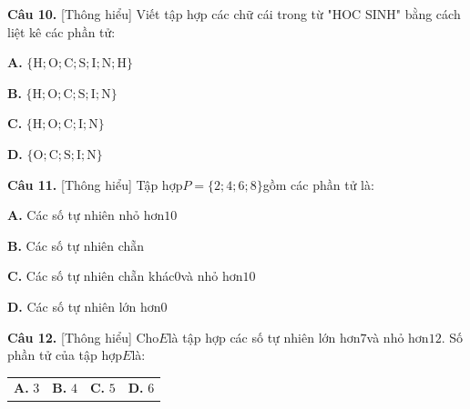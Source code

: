 \documentclass[11pt,a4paper]{article}
\begin{document}
\noindent\textbf{Câu 10.} [Thông hiểu] Viết tập hợp các chữ cái trong từ "HOC SINH" bằng cách liệt kê các phần tử:\par\vspace{2pt}
\noindent\textbf{A.} $\{\text{H}; \text{O}; \text{C}; \text{S}; \text{I}; \text{N}; \text{H}\}$\par\vspace{1pt}
\noindent\textbf{B.} $\{\text{H}; \text{O}; \text{C}; \text{S}; \text{I}; \text{N}\}$\par\vspace{1pt}
\noindent\textbf{C.} $\{\text{H}; \text{O}; \text{C}; \text{I}; \text{N}\}$\par\vspace{1pt}
\noindent\textbf{D.} $\{\text{O}; \text{C}; \text{S}; \text{I}; \text{N}\}$\par\vspace{5pt}

\noindent\textbf{Câu 11.} [Thông hiểu] Tập hợp$P = \{2; 4; 6; 8\}$gồm các phần tử là:\par\vspace{2pt}
\noindent\textbf{A.} Các số tự nhiên nhỏ hơn$10$\par\vspace{1pt}
\noindent\textbf{B.} Các số tự nhiên chẵn\par\vspace{1pt}
\noindent\textbf{C.} Các số tự nhiên chẵn khác$0$và nhỏ hơn$10$\par\vspace{1pt}
\noindent\textbf{D.} Các số tự nhiên lớn hơn$0$\par\vspace{5pt}

\noindent\textbf{Câu 12.} [Thông hiểu] Cho$E$là tập hợp các số tự nhiên lớn hơn$7$và nhỏ hơn$12$. Số phần tử của tập hợp$E$là:\par\vspace{2pt}
\noindent\begin{tabular*}{\textwidth}{@{\extracolsep{\fill}}llll@{}}
\textbf{A.} $3$ & \textbf{B.} $4$ & \textbf{C.} $5$ & \textbf{D.} $6$
\end{tabular*}\par\vspace{5pt}
\end{document}
